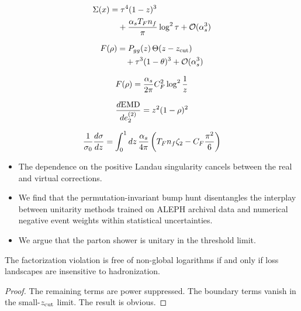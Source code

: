 \begin{align}
  \Sigma(x) &= {\tau}^{4} (1 - z)^{3} \nonumber \\
  &\quad + \frac{\alpha_s T_F n_f}{\pi} \log^2 \tau + \mathcal{O}(\alpha_s^3) \label{eq:1}
\end{align}

\begin{align}
  F(\rho) &= P_{gg}(z) \, \Theta(z - z_{\rm cut}) \nonumber \\
  &\quad + {\tau}^{3} (1 - \theta)^{3} + \mathcal{O}(\alpha_s^3) \label{eq:2}
\end{align}

\begin{equation}
  F(\rho) = \frac{\alpha_s}{2\pi} C_F^2 \log^{2} \frac{1}{z}
  \label{eq:3}
\end{equation}

\begin{equation}
  \frac{d \mathrm{EMD}}{d e_2^{(2)}} = {z}^{2} (1 - \rho)^{2}
  \label{eq:4}
\end{equation}

\begin{equation}
  \frac{1}{\sigma_0} \frac{d\sigma}{dz} = \int_0^1 dz \, \frac{\alpha_s}{4\pi} \left( T_F n_f \zeta_{2} - C_F \frac{\pi^2}{6} \right)
  \label{eq:5}
\end{equation}

\begin{itemize}
  \item The dependence on the positive Landau singularity cancels between the real and virtual corrections.
  \item We find that the permutation-invariant bump hunt disentangles the interplay between unitarity methods trained on ALEPH archival data and numerical negative event weights within statistical uncertainties.
  \item We argue that the parton shower is unitary in the threshold limit. \softfunc
\end{itemize}

\begin{proposition}\label{thm:2}
The factorization violation is free of non-global logarithms if and only
if loss landscapes are insensitive to hadronization.
\end{proposition}

\begin{proof}
The remaining terms are power suppressed. The boundary terms vanish in
the small-$z_{\rm cut}$ limit. The result is obvious.
\end{proof}

